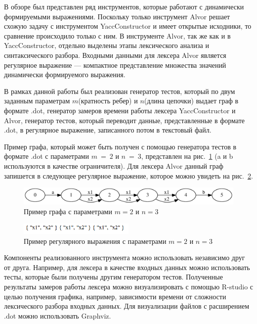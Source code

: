 В обзоре был представлен ряд инструментов, которые работают с динамически формируемыми выражениями. Поскольку только инструмент Alvor решает схожую 
задачу с инструментом YaccConstructor и имеет открытые исходники, то сравнение происходило только с ним.  В инструменте Alvor, так же как и в YaccConstructor, 
отдельно выделены этапы лексического анализа и синтаксического разбора. Входными данными для лексера Alvor является регулярное выражение --- компактное представление 
множества значений динамически формируемого выражения. 

В рамках данной работы был реализован генератор тестов, который по двум заданным параметрам $m$(кратность ребер) и $n$(длина цепочки) выдает граф в формате .dot, генератор замеров времени работы лексера YaccConstructor и Alvor, генератор тестов, который переводит данные, представленные в формате .dot, в регулярное выражение, записанного потом в текстовый файл. 

Пример  графа, который может быть получен с помощью генератора тестов в формате .dot с параметрами $m~=~2$ и $n~=~3$, представлен на рис.~\ref{fig:m2_n3} (a и b используются в качестве ограничителя). Для лексера Alvor данный граф запишется в следующее регулярное выражение, которое можно увидеть 
на рис.~\ref{fig:m2_n3_alvor}. 
 
\begin{figure}[t]
\centering
\includegraphics[width=\textwidth]{Polubelova/m2_n3}
\caption{Пример графа с параметрами $m = 2$ и $n = 3$}
\label{fig:m2_n3} 
\end{figure}

\begin{figure}[t]
\centering
\includegraphics[width=0.5\textwidth]{Polubelova/m2_n3_alvor}
\caption{Пример регулярного выражения с параметрами $m = 2$ и $n = 3$}
\label{fig:m2_n3_alvor} 
\end{figure}

Компоненты реализованного инструмента можно использовать независимо друг от друга. Например, для лексера в качестве входных данных можно использовать тесты, 
которые были получены другим генератором тестов.  Полученные результаты замеров работы лексера можно визуализировать с помощью R-studio с целью получения графика, 
например, зависимости времени от сложности лексического разбора входных данных. Для визуализации файлов с расширением .dot можно использовать Graphviz.

